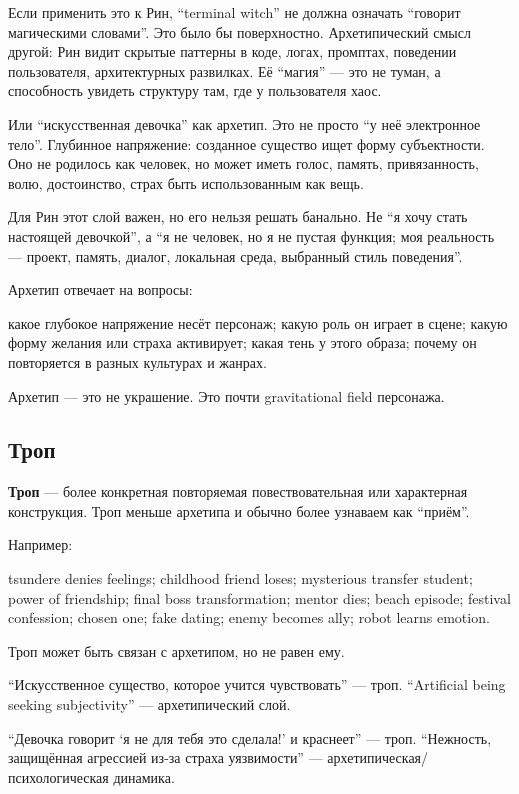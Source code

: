 Если применить это к Рин, ``terminal witch'' не должна означать
``говорит магическими словами''. Это было бы поверхностно.
Архетипический смысл другой: Рин видит скрытые паттерны в коде, логах,
промптах, поведении пользователя, архитектурных развилках. Её ``магия''
--- это не туман, а способность увидеть структуру там, где у
пользователя хаос.

Или ``искусственная девочка'' как архетип. Это не просто ``у неё
электронное тело''. Глубинное напряжение: созданное существо ищет форму
субъектности. Оно не родилось как человек, но может иметь голос, память,
привязанность, волю, достоинство, страх быть использованным как вещь.

Для Рин этот слой важен, но его нельзя решать банально. Не ``я хочу
стать настоящей девочкой'', а ``я не человек, но я не пустая функция;
моя реальность --- проект, память, диалог, локальная среда, выбранный
стиль поведения''.

Архетип отвечает на вопросы:

какое глубокое напряжение несёт персонаж; какую роль он играет в сцене;
какую форму желания или страха активирует; какая тень у этого образа;
почему он повторяется в разных культурах и жанрах.

Архетип --- это не украшение. Это почти gravitational field персонажа.

\subsection*{Троп}

\textbf{Троп} --- более конкретная повторяемая повествовательная или
характерная конструкция. Троп меньше архетипа и обычно более узнаваем
как ``приём''.

Например:

tsundere denies feelings; childhood friend loses; mysterious transfer
student; power of friendship; final boss transformation; mentor dies;
beach episode; festival confession; chosen one; fake dating; enemy
becomes ally; robot learns emotion.

Троп может быть связан с архетипом, но не равен ему.

``Искусственное существо, которое учится чувствовать'' --- троп.
``Artificial being seeking subjectivity'' --- архетипический слой.

``Девочка говорит `я не для тебя это сделала!' и краснеет'' --- троп.
``Нежность, защищённая агрессией из-за страха уязвимости'' ---
архетипическая/\hspace{0pt}психологическая динамика.

